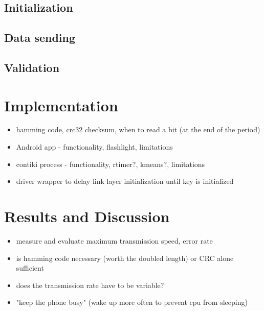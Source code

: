 \documentclass{sig-alternate} %
\begin{document}
\subsection{Initialization}
\label{sub:initialization}

\subsection{Data sending}
\label{sub:data_sending}

\subsection{Validation}
\label{sub:validation}



\section{Implementation}
\label{sec:implementation}

\begin{itemize}
	\item hamming code, crc32 checksum, when to read a bit (at the end of the period)
	\item Android app - functionality, flashlight, limitations
	\item contiki process - functionality, rtimer?, kmeans?, limitations
	\item driver wrapper to delay link layer initialization until key is initialized
\end{itemize}



\section{Results and Discussion}
\label{sec:results_and_discussion}

\begin{itemize}
	\item measure and evaluate maximum transmission speed, error rate
	\item is hamming code necessary (worth the doubled length) or CRC alone sufficient
	\item does the transmission rate have to be variable?
	\item "keep the phone busy" (wake up more often to prevent cpu from sleeping)
\end{itemize}
\end{document}
